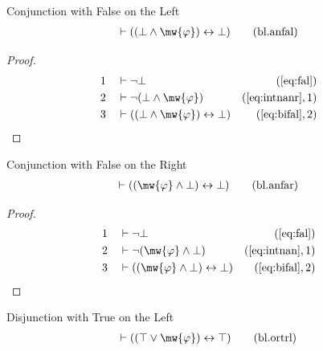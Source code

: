 
\dfblbool*

\begin{lemma} {Conjunction with False on the Left}
\begin{align}
\vdash ( ( \bot \wedge \mw{\varphi} ) \leftrightarrow \bot
    )\label{eq:bl.anfal}\tag{bl.anfal}
\end{align}
\end{lemma}


\begin{proof}
\begin{align}
  1 &&  & \vdash \lnot \bot&(\mbox{\ref{eq:fal}})\notag
  \\ 2 &&  & \vdash \lnot ( \bot \wedge \mw{\varphi}
     )&(\mbox{\ref{eq:intnanr}},1)\notag
  \\ 3 &&  & \vdash ( ( \bot \wedge \mw{\varphi} ) \leftrightarrow \bot
     )&(\mbox{\ref{eq:bifal}},2)\notag
\end{align}
\end{proof}

\begin{lemma} {Conjunction with False on the Right}
\begin{align}
\vdash ( ( \mw{\varphi} \wedge \bot ) \leftrightarrow \bot
    )\label{eq:bl.anfar}\tag{bl.anfar}
\end{align}
\end{lemma}


\begin{proof}
\begin{align}
  1 &&  & \vdash \lnot \bot&(\mbox{\ref{eq:fal}})\notag
  \\ 2 &&  & \vdash \lnot ( \mw{\varphi} \wedge \bot
     )&(\mbox{\ref{eq:intnan}},1)\notag
  \\ 3 &&  & \vdash ( ( \mw{\varphi} \wedge \bot ) \leftrightarrow \bot
     )&(\mbox{\ref{eq:bifal}},2)\notag
\end{align}
\end{proof}

\begin{lemma} {Disjunction with True on the Left}
\begin{align}
\vdash ( ( \top \vee \mw{\varphi} ) \leftrightarrow \top
    )\label{eq:bl.ortrl}\tag{bl.ortrl}
\end{align}
\end{lemma}


